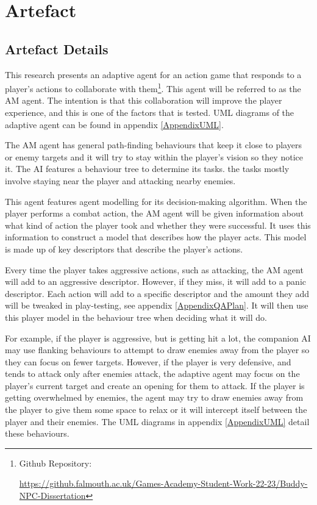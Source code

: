 \documentclass{IEEEtran}
\begin{document}
\section{Artefact}
\label{Artefact}

\subsection{Artefact Details}
\label{ArtefactDetails}

This research presents an adaptive agent for an action game that responds to a player's actions to collaborate with them\footnote{Github Repository:

\url{https://github.falmouth.ac.uk/Games-Academy-Student-Work-22-23/Buddy-NPC-Dissertation}}. This agent will be referred to as the AM agent. The intention is that this collaboration will improve the player experience, and this is one of the factors that is tested. UML diagrams of the adaptive agent can be found in appendix \ref{AppendixUML}.

The AM agent has general path-finding behaviours that keep it close to players or enemy targets and it will try to stay within the player's vision so they notice it. The AI features a behaviour tree to determine its tasks. the tasks mostly involve staying near the player and attacking nearby enemies.

This agent features agent modelling for its decision-making algorithm. When the player performs a combat action, the AM agent will be given information about what kind of action the player took and whether they were successful. It uses this information to construct a model that describes how the player acts. This model is made up of key descriptors that describe the player's actions.

Every time the player takes aggressive actions, such as attacking, the AM agent will add to an aggressive descriptor. However, if they miss, it will add to a panic descriptor. Each action will add to a specific descriptor and the amount they add will be tweaked in play-testing, see appendix \ref{AppendixQAPlan}. It will then use this player model in the behaviour tree when deciding what it will do.

For example, if the player is aggressive, but is getting hit a lot, the companion AI may use flanking behaviours to attempt to draw enemies away from the player so they can focus on fewer targets. However, if the player is very defensive, and tends to attack only after enemies attack, the adaptive agent may focus on the player's current target and create an opening for them to attack. If the player is getting overwhelmed by enemies, the agent may try to draw enemies away from the player to give them some space to relax or it will intercept itself between the player and their enemies. The UML diagrams in appendix \ref{AppendixUML} detail these behaviours.
\end{document}
